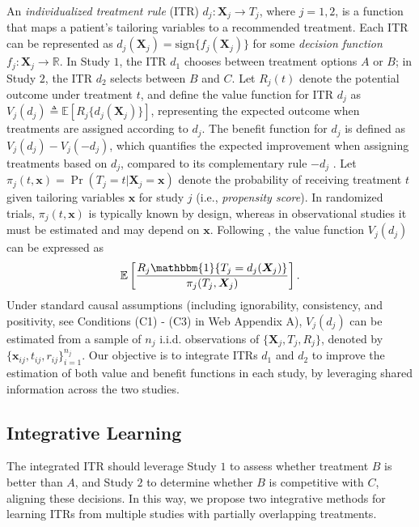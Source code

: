 \documentclass[12pt]{article}
\begin{document}
An {\it individualized treatment rule} (ITR) $d_j:\boldsymbol X_j\to T_j$, where $j=1,2$, is a function that maps a patient's tailoring variables to a recommended treatment. Each ITR can be represented as $d_j(\boldsymbol X_j)=\text{sign}\{{f_j(\boldsymbol X_j)}\}$ for some {\it decision function} $f_j:\boldsymbol X_j\to\mathbb{R}$. In Study $1$, the ITR $d_1$ chooses between treatment options $A$ or $B$; in Study $2$, the ITR $d_2$ selects between $B$ and $C$. Let $R_j(t)$ denote the potential outcome under treatment $t$, and define the value function for ITR $d_j$ as $V_j(d_j)\triangleq \mathbb{E}[R_j\{d_j(\boldsymbol X_j)\}]$, representing the expected outcome when treatments are assigned according to $d_j$. The benefit function for $d_j$ is defined as $V_j(d_j)-V_j(-d_j)$, which quantifies the expected improvement when assigning treatments based on $d_j$, compared to its complementary rule $-d_j$ \citep{qiu2018estimation}. Let $\pi_j(t,\boldsymbol x)=\Pr(T_j=t|\boldsymbol X_j=\boldsymbol x)$ denote the probability of receiving treatment $t$ given tailoring variables $\boldsymbol{x}$ for study $j$ (i.e., {\it propensity score}). In randomized trials, $\pi_j(t,\boldsymbol x)$ is typically known by design, whereas in observational studies it must be estimated and may depend on $\boldsymbol x$. Following \cite{qian2011performance}, the value function $V_j(d_j)$ can be expressed as 
\begin{equation}
\label{eq: v}
\mathbb{E}\left[\frac{R_j\mathbbm{1}\{T_j=d_j(\boldsymbol X_j)\}}{\pi_j(T_j,\boldsymbol X_j)}\right].
\end{equation}
Under standard causal assumptions (including ignorability, consistency, and positivity, see Conditions (C1) - (C3) in Web Appendix A), $V_j(d_j)$ can be estimated from a sample of $n_j$ i.i.d. observations of $\{\boldsymbol X_j,T_j,R_j\}$, denoted by $\{\boldsymbol x_{ij},t_{ij},r_{ij}\}_{i=1}^{n_j}$. Our objective is to integrate ITRs $d_1$ and $d_2$ to improve the estimation of both value and benefit functions in each study, by leveraging shared information across the two studies.

\subsection{Integrative Learning}
The integrated ITR should leverage Study $1$ to assess whether treatment $B$ is better than $A$, and Study $2$ to determine whether $B$ is competitive with $C$, aligning these decisions. In this way, 
we propose two integrative methods for learning ITRs from multiple studies with partially overlapping treatments. 
\end{document}
